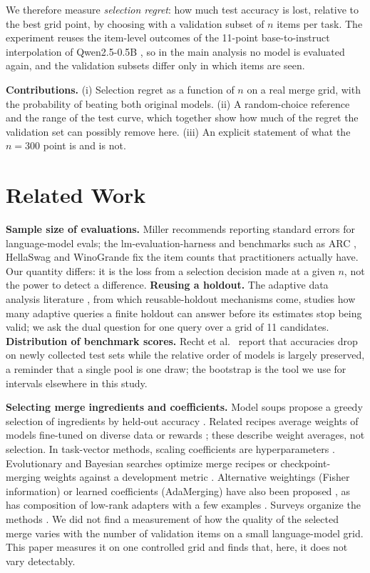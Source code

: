 \documentclass[conference]{IEEEtran}
\begin{document}
We therefore measure \emph{selection regret}: how much test accuracy is lost, relative to the best grid point, by choosing with a validation subset of $n$ items per task. The experiment reuses the item-level outcomes of the 11-point base-to-instruct interpolation of Qwen2.5-0.5B \cite{qwen2024qwen25}, so in the main analysis no model is evaluated again, and the validation subsets differ only in which items are seen.

\textbf{Contributions.} (i) Selection regret as a function of $n$ on a real merge grid, with the probability of beating both original models. (ii) A random-choice reference and the range of the test curve, which together show how much of the regret the validation set can possibly remove here. (iii) An explicit statement of what the $n=300$ point is and is not.

\section{Related Work}
\textbf{Sample size of evaluations.} Miller \cite{miller2024errorbars} recommends reporting standard errors for language-model evals; the lm-evaluation-harness \cite{gao2021lmeval} and benchmarks such as ARC \cite{clark2018arc}, HellaSwag \cite{zellers2019hellaswag} and WinoGrande \cite{sakaguchi2019winogrande} fix the item counts that practitioners actually have. Our quantity differs: it is the loss from a selection decision made at a given $n$, not the power to detect a difference. \textbf{Reusing a holdout.} The adaptive data analysis literature \cite{dwork2014adaptive}, from which reusable-holdout mechanisms come, studies how many adaptive queries a finite holdout can answer before its estimates stop being valid; we ask the dual question for one query over a grid of 11 candidates. \textbf{Distribution of benchmark scores.} Recht et al.\ \cite{recht2019imagenet} report that accuracies drop on newly collected test sets while the relative order of models is largely preserved, a reminder that a single pool is one draw; the bootstrap \cite{efron1979bootstrap} is the tool we use for intervals elsewhere in this study.

\textbf{Selecting merge ingredients and coefficients.} Model soups propose a greedy selection of ingredients by held-out accuracy \cite{wortsman2022soups}. Related recipes average weights of models fine-tuned on diverse data or rewards \cite{rame2022ratatouille,rame2023rewarded}; these describe weight averages, not selection. In task-vector methods, scaling coefficients are hyperparameters \cite{ilharco2022taskarithmetic,yadav2023ties}. Evolutionary and Bayesian searches optimize merge recipes or checkpoint-merging weights against a development metric \cite{akiba2024evolutionary,liu2024checkpointbo}. Alternative weightings (Fisher information) or learned coefficients (AdaMerging) have also been proposed \cite{matena2021fisher,yang2023adamerging}, as has composition of low-rank adapters with a few examples \cite{huang2023lorahub}. Surveys organize the methods \cite{yang2024survey}. We did not find a measurement of how the quality of the selected merge varies with the number of validation items on a small language-model grid. This paper measures it on one controlled grid and finds that, here, it does not vary detectably.
\end{document}

